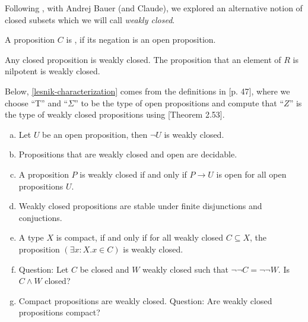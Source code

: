 Following \cite{lesnik2021synthetictopologyconstructivemetric}, with Andrej Bauer (and Claude), we explored an alternative notion of closed subsets which we will call \emph{weakly closed}.

\begin{definition}
  A proposition \(C\) is , if its negation is an open proposition.
\end{definition}

\begin{example}
  Any closed proposition is weakly closed. The proposition that an element of \(R\) is nilpotent is weakly closed.
\end{example}

Below, \ref{lesnik-characterization} comes from the definitions in \cite{lesnik2021synthetictopologyconstructivemetric}[p. 47], where we choose ``T'' and ``\(\Sigma\)'' to be the type of open propositions and compute that ``\(Z\)'' is the type of weakly closed propositions using \cite{lesnik2021synthetictopologyconstructivemetric}[Theorem 2.53].

\begin{remark}
  \begin{enumerate}[(a)]
  \item Let \(U\) be an open proposition, then \(\neg U\) is weakly closed.
  \item Propositions that are weakly closed and open are decidable.
  \item \label{lesnik-characterization} A proposition \(P\) is weakly closed if and only if \(P\to U\) is open for all open propositions \(U\).
  \item Weakly closed propositions are stable under finite disjunctions and conjuctions.
  \item A type \(X\) is compact, if and only if for all
    weakly closed \(C\subseteq X\), the proposition \((\exists x:X.x\in C)\) is weakly closed.
  \item Question: Let \(C\) be closed and \(W\) weakly closed such that \(\neg\neg C=\neg\neg W\).
    Is \(C\wedge W\) closed?
  \item Compact propositions are weakly closed. Question: Are weakly closed propositions compact?
  \end{enumerate}
\end{remark}

